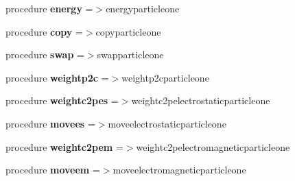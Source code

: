 \begin{DoxyCompactItemize}
\item 
\mbox{\label{structmoduleparticleone_1_1particleone_a929239ffca1bb0d445a6fc19b6226534}} 
procedure {\bfseries energy} =$>$energyparticleone
\item 
\mbox{\label{structmoduleparticleone_1_1particleone_a9039703f89507bf814a293207fe4e52e}} 
procedure {\bfseries copy} =$>$copyparticleone
\item 
\mbox{\label{structmoduleparticleone_1_1particleone_a593b41a8cc03bdda015481da901da1ae}} 
procedure {\bfseries swap} =$>$swapparticleone
\item 
\mbox{\label{structmoduleparticleone_1_1particleone_af959a68f53ae5c3afa99d276cfe0bd2f}} 
procedure {\bfseries weightp2c} =$>$weightp2cparticleone
\item 
\mbox{\label{structmoduleparticleone_1_1particleone_a632b2100b8684c5d7ef668be707f1dda}} 
procedure {\bfseries weightc2pes} =$>$weightc2pelectrostaticparticleone
\item 
\mbox{\label{structmoduleparticleone_1_1particleone_a66861672fbfd9ac779ef079c9ee6d4d1}} 
procedure {\bfseries movees} =$>$moveelectrostaticparticleone
\item 
\mbox{\label{structmoduleparticleone_1_1particleone_ac3acc176a400962cb854ffd0c3a709c2}} 
procedure {\bfseries weightc2pem} =$>$weightc2pelectromagneticparticleone
\item 
\mbox{\label{structmoduleparticleone_1_1particleone_aaab6c925716baae3a5f76d541789a060}} 
procedure {\bfseries moveem} =$>$moveelectromagneticparticleone
\end{DoxyCompactItemize}
